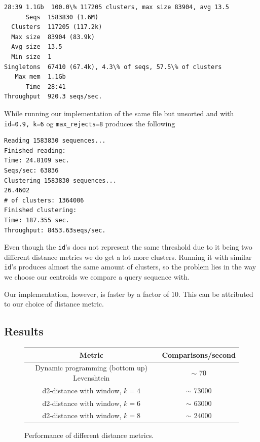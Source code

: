 \begin{lstlisting}
28:39 1.1Gb  100.0\% 117205 clusters, max size 83904, avg 13.5                                                        
      Seqs  1583830 (1.6M)
  Clusters  117205 (117.2k)
  Max size  83904 (83.9k)
  Avg size  13.5
  Min size  1
Singletons  67410 (67.4k), 4.3\% of seqs, 57.5\% of clusters
   Max mem  1.1Gb
      Time  28:41
Throughput  920.3 seqs/sec.
\end{lstlisting}
While running our implementation of the same file but unsorted and with \texttt{id=0.9, k=6} og \texttt{max\_rejects=8} produces the following
\begin{lstlisting}
Reading 1583830 sequences...
Finished reading:
Time: 24.8109 sec.
Seqs/sec: 63836
Clustering 1583830 sequences...
26.4602
# of clusters: 1364006
Finished clustering:
Time: 187.355 sec.
Throughput: 8453.63seqs/sec.
\end{lstlisting}
Even though the \texttt{id}'s does not represent the same threshold due to it 
being two different distance metrics we do get a lot more clusters. Running 
it with similar \texttt{id}'s produces almost the same amount of clusters, so 
the problem lies in the way we choose our centroids we compare a query 
sequence with.

Our implementation, however, is faster by a factor of $10$. This can be 
attributed to our choice of distance metric.
\\


\subsection{Results}
\begin{figure}[H]
  \centering
  \begin{tabular}{ c | c }
    Metric                                        & Comparisons/second      \\
    \hline \hline
    Dynamic programming (bottom up) Levenshtein   & $\sim$ 70               \\
    \hline
    d2-distance with window, $k=4$                & $\sim$ 73000            \\
    \hline
    d2-distance with window, $k=6$                & $\sim$ 63000            \\
    \hline
    d2-distance with window, $k=8$                & $\sim$ 24000            \\
  \end{tabular}
  \caption{Performance of different distance metrics.}
\end{figure}

